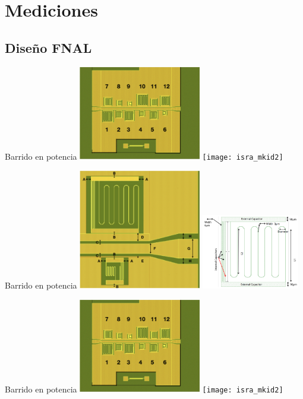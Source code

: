 \documentclass[ignorenonframetext,12pt]{beamer}
\begin{document}
\section{Mediciones}
\subsection{Diseño FNAL}%
\begin{frame}{Barrido en potencia}
				\centering
												\includegraphics[width=0.4\textwidth]{isra_mkid1}
												\texttt{[image: isra\_mkid2]}
\end{frame}
\begin{frame}{Barrido en potencia}
				\centering
												\includegraphics[width=0.4\textwidth]{isra_mkid3}
												\includegraphics[width=0.32\textwidth]{isra_mkid4}
\end{frame}
\begin{frame}{Barrido en potencia}
				\centering
												\includegraphics[width=0.4\textwidth]{isra_mkid1}
												\texttt{[image: isra\_mkid2]}
\end{frame}
\end{document}

